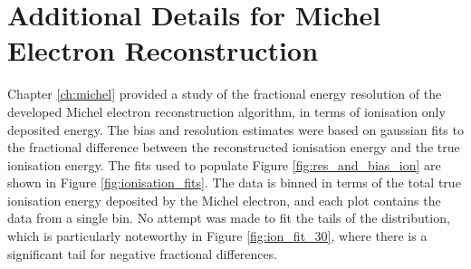 \chapter{Additional Details for Michel Electron Reconstruction}\label{ch:energyfits}

\minitoc

Chapter \ref{ch:michel} provided a study of the fractional energy resolution of
the developed Michel electron reconstruction algorithm, in terms of ionisation
only deposited energy. The bias and resolution estimates were based on
gaussian fits to the fractional difference between the reconstructed ionisation
energy and the true ionisation energy. The fits used to populate Figure
\ref{fig:res_and_bias_ion} are shown in Figure \ref{fig:ionisation_fits}. The 
data is binned in terms of the total true ionisation energy deposited by the 
Michel electron, and each plot contains the data from a single bin. No attempt 
was made to fit the tails of the distribution, which is particularly 
noteworthy in Figure \ref{fig:ion_fit_30}, where there is a significant tail 
for negative fractional differences. 

